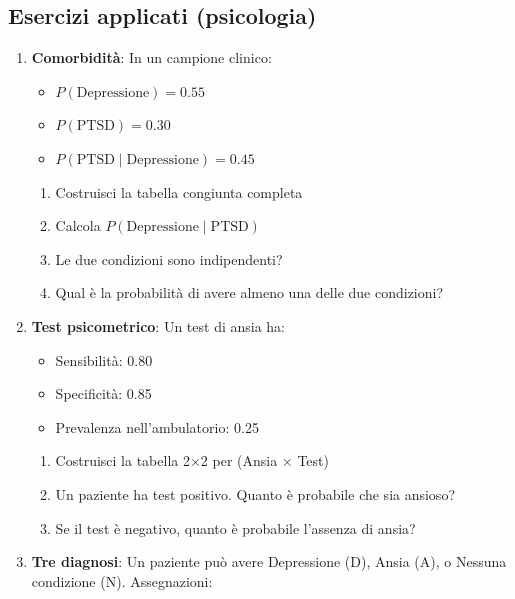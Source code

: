 \documentclass[
  italian,
  letterpaper,
  a4paper,
  11pt,
  open=any]{scrbook}
\providecommand{\tightlist}{%
  \setlength{\itemsep}{0pt}\setlength{\parskip}{0pt}}
\theoremstyle{plain}
\theoremstyle{definition}
\theoremstyle{definition}
\theoremstyle{remark}
\begin{document}
\begin{tcolorbox}
\subsection{Esercizi applicati
(psicologia)}\label{esercizi-applicati-psicologia}

\begin{enumerate}
\def\labelenumi{\arabic{enumi}.}
\setcounter{enumi}{9}
\item
  \textbf{Comorbidità}: In un campione clinico:

  \begin{itemize}
  \tightlist
  \item
    \(P(\text{Depressione}) = 0.55\)
  \item
    \(P(\text{PTSD}) = 0.30\)
  \item
    \(P(\text{PTSD} \mid \text{Depressione}) = 0.45\)
  \end{itemize}

  \begin{enumerate}
  \def\labelenumii{\alph{enumii}.}
  \tightlist
  \item
    Costruisci la tabella congiunta completa
  \item
    Calcola \(P(\text{Depressione} \mid \text{PTSD})\)
  \item
    Le due condizioni sono indipendenti?
  \item
    Qual è la probabilità di avere almeno una delle due condizioni?
  \end{enumerate}
\item
  \textbf{Test psicometrico}: Un test di ansia ha:

  \begin{itemize}
  \tightlist
  \item
    Sensibilità: 0.80
  \item
    Specificità: 0.85
  \item
    Prevalenza nell'ambulatorio: 0.25
  \end{itemize}

  \begin{enumerate}
  \def\labelenumii{\alph{enumii}.}
  \tightlist
  \item
    Costruisci la tabella 2×2 per (Ansia × Test)
  \item
    Un paziente ha test positivo. Quanto è probabile che sia ansioso?
  \item
    Se il test è negativo, quanto è probabile l'assenza di ansia?
  \end{enumerate}
\item
  \textbf{Tre diagnosi}: Un paziente può avere Depressione (D), Ansia
  (A), o Nessuna condizione (N). Assegnazioni:


\end{enumerate}
\end{tcolorbox}
\end{document}

